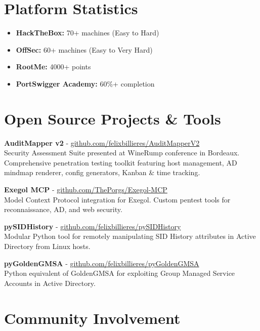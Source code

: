 \documentclass[11pt,a4paper]{article}
\begin{document}
\section{Platform Statistics}

\begin{itemize}[leftmargin=*, noitemsep]
    \item \textbf{HackTheBox:} 70+ machines (Easy to Hard)
    \item \textbf{OffSec:} 60+ machines (Easy to Very Hard)
    \item \textbf{RootMe:} 4000+ points
    \item \textbf{PortSwigger Academy:} 60\%+ completion
\end{itemize}

\section{Open Source Projects \& Tools}

\textbf{AuditMapper v2} - \href{https://github.com/felixbillieres/AuditMapperV2}{github.com/felixbillieres/AuditMapperV2} \\
Security Assessment Suite presented at WineRump conference in Bordeaux. Comprehensive penetration testing toolkit featuring host management, AD mindmap renderer, config generators, Kanban \& time tracking.

\textbf{Exegol MCP} - \href{https://github.com/ThePorgs/Exegol-MCP}{github.com/ThePorgs/Exegol-MCP} \\
Model Context Protocol integration for Exegol. Custom pentest tools for reconnaissance, AD, and web security.

\textbf{pySIDHistory} - \href{https://github.com/felixbillieres/pySIDHistory}{github.com/felixbillieres/pySIDHistory} \\
Modular Python tool for remotely manipulating SID History attributes in Active Directory from Linux hosts.

\textbf{pyGoldenGMSA} - \href{https://github.com/felixbillieres/pyGoldenGMSA}{github.com/felixbillieres/pyGoldenGMSA} \\
Python equivalent of GoldenGMSA for exploiting Group Managed Service Accounts in Active Directory.

\section{Community Involvement}
\end{document}
